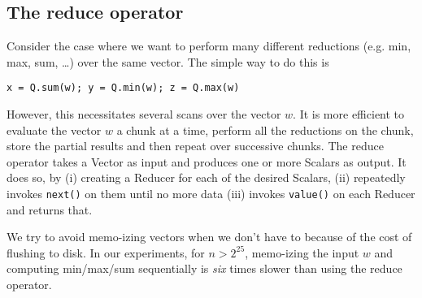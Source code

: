 \subsection{The reduce operator}
\label{reduce_operator}
Consider the case where we want to perform many different reductions (e.g. min,
max, sum, \ldots) over the same vector. The simple way to do this is
\begin{verbatim}
x = Q.sum(w); y = Q.min(w); z = Q.max(w)
\end{verbatim}
However, this necessitates several scans over the vector \(w\). It is more
efficient to evaluate the vector \(w\) a chunk at a time, perform all the
reductions on the chunk, store the partial results and then repeat over
successive chunks. The reduce operator takes a Vector as input and produces one
or more Scalars as output. It does so, by 
(i) creating a Reducer for each of the desired Scalars,
(ii) repeatedly invokes {\tt next()} on them until no more data
(iii) invokes {\tt value()} on each Reducer and returns that.

We try to avoid memo-izing vectors when we don't have to because 
of the cost of flushing to disk. In our experiments, for \(n > 2^{25}\), 
memo-izing the input \(w\) and computing min/max/sum sequentially 
is {\em six} times slower than using the reduce operator.
